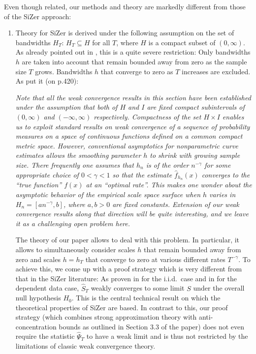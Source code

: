 \documentclass[a4paper,12pt]{article}
\begin{document}
Even though related, our methods and theory are markedly different from those of the SiZer approach:
\begin{enumerate}[label=(\roman*), leftmargin=0.8cm]

\item Theory for SiZer is derived under the following assumption on the set of bandwidths $H_T$: $H_T \subseteq H$ for all $T$, where $H$ is a compact subset of $(0,\infty)$. As already pointed out in \cite{ChaudhuriMarron2000}, this is a quite severe restriction: Only bandwidths $h$ are taken into account that remain bounded away from zero as the sample size $T$ grows. Bandwidths $h$ that converge to zero as $T$ increases are excluded.  As \cite{ChaudhuriMarron2000} put it (on p.420):
\vspace{0.15cm}

\begin{spacing}{1.1}
{\small \textit{Note that all the weak convergence results in this section have been established under the assumption that both of $H$ and $I$ are fixed compact subintervals of $(0,\infty)$ and $(-\infty,\infty)$ respectively. Compactness of the set $H \times I$ enables us to exploit standard results on weak convergence of a sequence of probability measures on a space of continuous functions defined on a common compact metric space. However, conventional asymptotics for nonparametric curve estimates allows the smoothing parameter $h$ to shrink with growing sample size. There frequently one assumes that $h_n$ is of the order $n^{-\gamma}$ for some appropriate choice of $0 < \gamma < 1$ so that the estimate $\hat{f}_{h_n}(x)$ converges to the ``true function'' $f(x)$ at an ``optimal rate''. This makes one wonder about the asymptotic behavior of the empirical scale space surface when $h$ varies in $H_n = [a n^{-\gamma},b]$, where $a,b > 0$ are fixed constants. Extension of our weak convergence results along that direction will be quite interesting, and we leave it as a challenging open problem here.} }
\end{spacing} 
\vspace{0.2cm}

The theory of our paper allows to deal with this problem. In particular, it allows to simultaneously consider scales $h$ that remain bounded away from zero and scales $h = h_T$ that converge to zero at various different rates $T^{-\gamma}$. To achieve this, we come up with a proof strategy which is very different from that in the SiZer literature:  As proven in \cite{ChaudhuriMarron2000} for the i.i.d.\ case and in \cite{ParkHannigKang2009} for the dependent data case, $\widehat{S}_T$ weakly converges to some limit $S$ under the overall null hypothesis $H_0$. This is the central technical result on which the theoretical properties of SiZer are based. In contrast to this, our proof strategy (which combines strong approximation theory with anti-concentration bounds as outlined in Section 3.3 of the paper) does not even require the statistic $\widehat{\Psi}_T$ to have a weak limit and is thus not restricted by the limitations of classic weak convergence theory. 


\end{enumerate}
\end{document}
